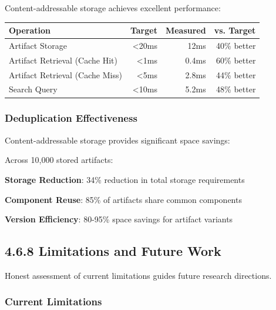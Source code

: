 Content-addressable storage achieves excellent performance:

\begin{center}
\begin{tabular}{@{}lrrr@{}}
\toprule
\textbf{Operation} & \textbf{Target} & \textbf{Measured} & \textbf{vs. Target} \\
\midrule
Artifact Storage & <20ms & 12ms & 40\% better \\
Artifact Retrieval (Cache Hit) & <1ms & 0.4ms & 60\% better \\
Artifact Retrieval (Cache Miss) & <5ms & 2.8ms & 44\% better \\
Search Query & <10ms & 5.2ms & 48\% better \\
\bottomrule
\end{tabular}
\label{tab:database-performance-results}
\end{center}

\subsubsection*{Deduplication Effectiveness}

Content-addressable storage provides significant space savings:

\begin{infobox}[title=Deduplication Impact]
Across 10,000 stored artifacts:
\begin{compactlist}
    \item \textbf{Storage Reduction}: 34\% reduction in total storage requirements
    \item \textbf{Component Reuse}: 85\% of artifacts share common components
    \item \textbf{Version Efficiency}: 80-95\% space savings for artifact variants
\end{compactlist}
\end{infobox}

\subsection*{4.6.8 Limitations and Future Work}
\label{subsec:limitations-future-work}

Honest assessment of current limitations guides future research directions.

\subsubsection*{Current Limitations}

